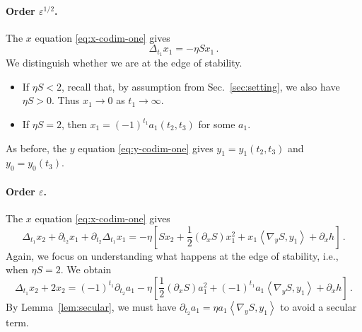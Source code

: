 \documentclass[11pt,english,reqno]{article}
\theoremstyle{plain}
\theoremstyle{definition}
\theoremstyle{remark}
\numberwithin{equation}{section}
\begin{document}
        \paragraph{Order $\varepsilon^{1/2}$.}
        The $x$ equation \eqref{eq:x-codim-one} gives
        \begin{equation*}
            \Delta_{t_1} x_1 = - \eta S x_1 \, .
        \end{equation*}
        We distinguish whether we are at the edge of stability.
        \begin{itemize}
            \item If $\eta S < 2$, recall that, by assumption from Sec.~\ref{sec:setting}, we also have $\eta S > 0$. Thus $x_1 \to 0$ as $t_1 \to \infty$. 
            \item If $\eta S = 2$, then $x_1 = (-1)^{t_1} a_1(t_2, t_3)$ for some $a_1$. 
        \end{itemize}
        As before, the $y$ equation \eqref{eq:y-codim-one} gives $y_1 = y_1(t_2, t_3)$ and $y_0 = y_0(t_3)$.

        \paragraph{Order $\varepsilon$.} The $x$ equation \eqref{eq:x-codim-one} gives
        \begin{equation*}
            \Delta_{t_1} x_2 + \partial_{t_2} x_1 + \partial_{t_2} \Delta_{t_1} x_1 = - \eta \left[S x_2 + \frac{1}{2} (\partial_x S) x_1^2 + x_1 \left\langle \nabla_y S, y_1 \right\rangle + \partial_x h\right] \,.
        \end{equation*}
        Again, we focus on understanding what happens at the edge of stability, i.e., when $\eta S = 2$. We obtain
        \begin{equation*}
            \Delta_{t_1} x_2 +  2 x_2 = (-1)^{t_1} \partial_{t_2} a_1 - \eta \left[\frac{1}{2} (\partial_x S) a_1^2 +  (-1)^{t_1} a_1 \left\langle \nabla_y S, y_1 \right\rangle + \partial_x h\right] \, .
        \end{equation*}
        By Lemma~\ref{lem:secular}, we must have $\partial_{t_2} a_1 = \eta a_1 \left\langle \nabla_y S, y_1 \right\rangle$ to avoid a secular term.
\end{document}
